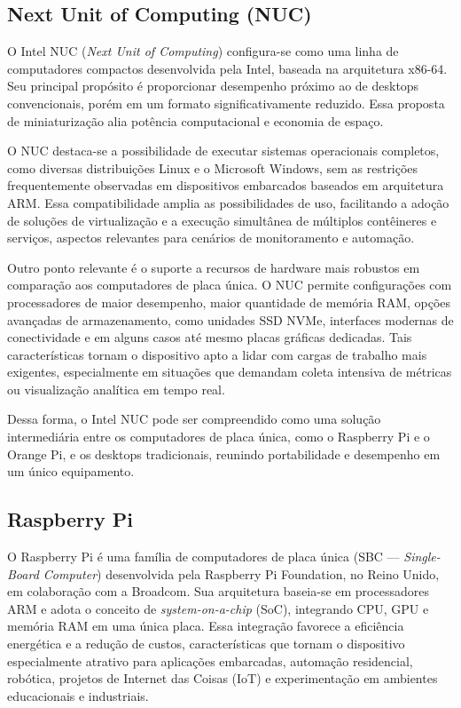 \subsection{Next Unit of Computing (NUC)}
\label{subsection:NUC}

O Intel NUC (\textit{Next Unit of Computing}) configura-se como uma linha de computadores compactos desenvolvida pela Intel, baseada na arquitetura x86-64. Seu principal propósito é proporcionar desempenho próximo ao de desktops convencionais, porém em um formato significativamente reduzido. Essa proposta de miniaturização alia potência computacional e economia de espaço.

O NUC destaca-se a possibilidade de executar sistemas operacionais completos, como diversas distribuições Linux e o Microsoft Windows, sem as restrições frequentemente observadas em dispositivos embarcados baseados em arquitetura ARM. Essa compatibilidade amplia as possibilidades de uso, facilitando a adoção de soluções de virtualização e a execução simultânea de múltiplos contêineres e serviços, aspectos relevantes para cenários de monitoramento e automação.

Outro ponto relevante é o suporte a recursos de hardware mais robustos em comparação aos computadores de placa única. O NUC permite configurações com processadores de maior desempenho, maior quantidade de memória RAM, opções avançadas de armazenamento, como unidades SSD NVMe, interfaces modernas de conectividade e em alguns casos até mesmo placas gráficas dedicadas. Tais características tornam o dispositivo apto a lidar com cargas de trabalho mais exigentes, especialmente em situações que demandam coleta intensiva de métricas ou visualização analítica em tempo real.

Dessa forma, o Intel NUC pode ser compreendido como uma solução intermediária entre os computadores de placa única, como o Raspberry Pi e o Orange Pi, e os desktops tradicionais, reunindo portabilidade e desempenho em um único equipamento.

\subsection{Raspberry Pi}
\label{subsection:RaspberryPi}

O Raspberry Pi é uma família de computadores de placa única (SBC — \textit{Single-Board Computer}) desenvolvida pela Raspberry Pi Foundation, no Reino Unido, em colaboração com a Broadcom. Sua arquitetura baseia-se em processadores ARM e adota o conceito de \textit{system-on-a-chip} (SoC), integrando CPU, GPU e memória RAM em uma única placa. Essa integração favorece a eficiência energética e a redução de custos, características que tornam o dispositivo especialmente atrativo para aplicações embarcadas, automação residencial, robótica, projetos de Internet das Coisas (IoT) e experimentação em ambientes educacionais e industriais.


